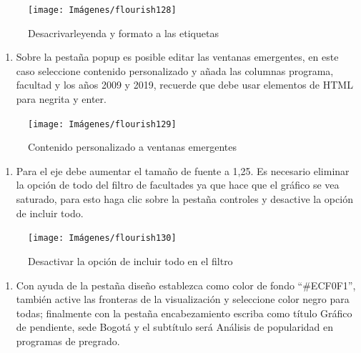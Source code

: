 \documentclass[
]{book}
\providecommand{\tightlist}{%
  \setlength{\itemsep}{0pt}\setlength{\parskip}{0pt}}
\begin{document}
\begin{figure}

{\centering \texttt{[image: Imágenes/flourish128]} 

}

\caption{Desacrivarleyenda y formato a las etiquetas}\label{fig:paso3pendienteflourish-fig}
\end{figure}

\begin{enumerate}
\def\labelenumi{\arabic{enumi}.}
\setcounter{enumi}{3}
\tightlist
\item
  Sobre la pestaña popup es posible editar las ventanas emergentes, en este caso seleccione contenido personalizado y añada las columnas programa, facultad y los años 2009 y 2019, recuerde que debe usar elementos de HTML para negrita y enter.
\end{enumerate}

\begin{figure}

{\centering \texttt{[image: Imágenes/flourish129]} 

}

\caption{Contenido personalizado a ventanas emergentes}\label{fig:paso4pendienteflourish-fig}
\end{figure}

\begin{enumerate}
\def\labelenumi{\arabic{enumi}.}
\setcounter{enumi}{4}
\tightlist
\item
  Para el eje debe aumentar el tamaño de fuente a 1,25. Es necesario eliminar la opción de todo del filtro de facultades ya que hace que el gráfico se vea saturado, para esto haga clic sobre la pestaña controles y desactive la opción de incluir todo.
\end{enumerate}

\begin{figure}

{\centering \texttt{[image: Imágenes/flourish130]} 

}

\caption{Desactivar la opción de incluir todo en el filtro}\label{fig:paso5pendienteflourish-fig}
\end{figure}

\begin{enumerate}
\def\labelenumi{\arabic{enumi}.}
\setcounter{enumi}{5}
\tightlist
\item
  Con ayuda de la pestaña diseño establezca como color de fondo ``\#ECF0F1'', también active las fronteras de la visualización y seleccione color negro para todas; finalmente con la pestaña encabezamiento escriba como título Gráfico de pendiente, sede Bogotá y el subtítulo será Análisis de popularidad en programas de pregrado.
\end{enumerate}
\end{document}
